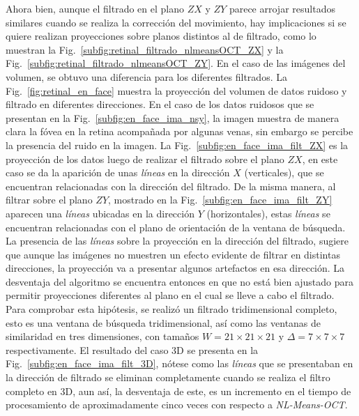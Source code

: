 Ahora bien, aunque el filtrado en el plano $ZX$ y $ZY$ parece arrojar resultados similares cuando se realiza la corrección del movimiento, hay implicaciones si se quiere realizan proyecciones sobre planos distintos al de filtrado, como lo muestran la Fig.~\ref{subfig:retinal_filtrado_nlmeansOCT_ZX} y la Fig.~\ref{subfig:retinal_filtrado_nlmeansOCT_ZY}. En el caso de las imágenes \enface del volumen, se obtuvo una diferencia para los diferentes filtrados. La Fig.~\ref{fig:retinal_en_face} muestra la proyección \enface del volumen de datos ruidoso y filtrado en diferentes direcciones. En el caso de los datos ruidosos que se presentan en la Fig.~\ref{subfig:en_face_ima_nsy}, la imagen \enface muestra de manera clara la fóvea en la retina acompañada por algunas venas, sin embargo se percibe la presencia del ruido en la imagen. La Fig.~\ref{subfig:en_face_ima_filt_ZX} es la proyección de los datos luego de realizar el filtrado sobre el plano $ZX$, en este caso se da la aparición de unas \emph{líneas} en la dirección $X$ (verticales), que se encuentran relacionadas con la dirección del filtrado. De la misma manera, al filtrar sobre el plano $ZY$, mostrado en la Fig.~\ref{subfig:en_face_ima_filt_ZY} aparecen una \emph{líneas} ubicadas en la dirección $Y$ (horizontales), estas \emph{líneas} se encuentran relacionadas con el plano de orientación de la ventana de búsqueda. La presencia de las \emph{líneas} sobre la proyección en la dirección del filtrado, sugiere que aunque las imágenes no muestren un efecto evidente de filtrar en distintas direcciones, la proyección \enface va a presentar algunos artefactos en esa dirección. La desventaja del algoritmo se encuentra entonces en que no está bien ajustado para permitir proyecciones diferentes al plano en el cual se lleve a cabo el filtrado. Para comprobar esta hipótesis, se realizó un filtrado tridimensional completo, esto es una ventana de búsqueda tridimensional, así como las ventanas de similaridad en tres dimensiones, con tamaños $W=21\times21\times21$ y $\Delta=7\times7\times7$ respectivamente. El resultado del caso 3D se presenta en la Fig.~\ref{subfig:en_face_ima_filt_3D}, nótese como las \emph{líneas} que se presentaban en la dirección de filtrado se eliminan completamente cuando se realiza el filtro completo en 3D, aun así, la desventaja de este, es un incremento en el tiempo de procesamiento de aproximadamente cinco veces con respecto a \textit{NL-Means-OCT}.


